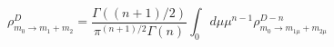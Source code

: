 \begin{equation}
 \rho^D_{m_0\rightarrow m_1+m_2}=\frac{\Gamma((n+1)/2)}{\pi^{(n+1)/2}\Gamma(n)}
 \int_0 d\mu \mu^{n-1} \rho^{D-n}_{m_0\rightarrow m_{1\mu}+m_{2\mu}}
\end{equation}

